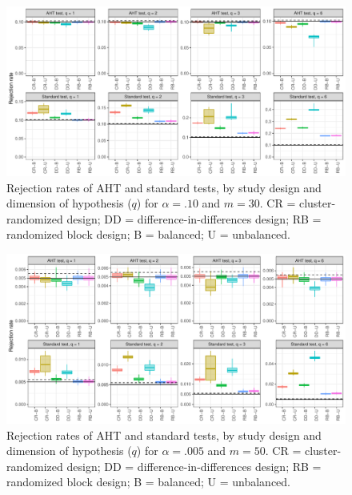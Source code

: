 \documentclass[12pt]{article}
\begin{document}
\begin{landscape}
\begin{figure}[H]
{\centering \includegraphics[width=\linewidth]{CR_fig/balance_10_30-1} 

}

\caption{Rejection rates of AHT and standard tests, by study design and dimension of hypothesis ($q$) for $\alpha = .10$ and $m = 30$. CR = cluster-randomized design; DD = difference-in-differences design; RB = randomized block design; B = balanced; U = unbalanced.}\label{fig:balance_10_30}
\end{figure}

\begin{figure}[H]

{\centering \includegraphics[width=\linewidth]{CR_fig/balance_005_50-1} 

}

\caption{Rejection rates of AHT and standard tests, by study design and dimension of hypothesis ($q$) for $\alpha = .005$ and $m = 50$. CR = cluster-randomized design; DD = difference-in-differences design; RB = randomized block design; B = balanced; U = unbalanced.}\label{fig:balance_005_50}
\end{figure}

\begin{figure}[H]


\end{figure}
\end{landscape}
\end{document}
